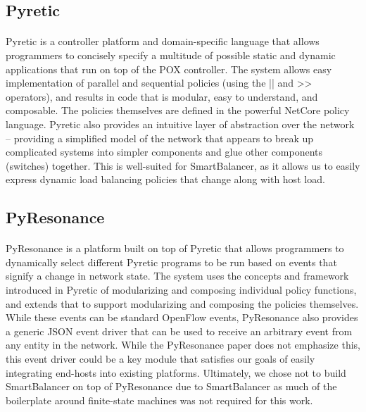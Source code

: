 \documentclass[10pt]{article}
\begin{document}
\subsection{Pyretic}

\paragraph{} Pyretic\cite{Pyretic} is a controller platform and domain-specific language that allows programmers to concisely specify a multitude of possible static and dynamic applications that run on top of the POX controller. The system allows easy implementation of parallel and sequential policies (using the || and >> operators), and results in code that is modular, easy to understand, and composable. The policies themselves are defined in the powerful NetCore policy language. Pyretic also provides an intuitive layer of abstraction over the network – providing a simplified model of the network that appears to break up complicated systems into simpler components and glue other components (switches) together. This is well-suited for SmartBalancer, as it allows us to easily express dynamic load balancing policies that change along with host load.


\subsection{PyResonance}

\paragraph{} PyResonance\cite{PyResonance} is a platform built on top of Pyretic that allows programmers to dynamically select different Pyretic programs to be run based on events that signify a change in network state. The system uses the concepts and framework introduced in Pyretic of modularizing and composing individual policy functions, and extends that to support modularizing and composing the policies themselves. While these events can be standard OpenFlow events, PyResonance also provides a generic JSON event driver that can be used to receive an arbitrary event from any entity in the network. While the PyResonance paper does not emphasize this, this event driver could be a key module that satisfies our goals of easily integrating end-hosts into existing platforms. Ultimately, we chose not to build SmartBalancer on top of PyResonance due to SmartBalancer as much of the boilerplate around finite-state machines was not required for this work.
\end{document}
